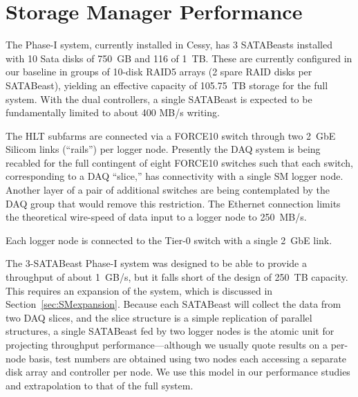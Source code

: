 


\section{Storage Manager Performance}

The Phase-I system, currently installed in Cessy, has
3 SATABeasts installed  with 10 Sata disks of 750~GB  and 116 of 1~TB.
These are currently configured in our baseline in groups of 10-disk RAID5 arrays 
(2 spare RAID disks per SATABeast), yielding an effective capacity of 105.75~TB storage
for the full system.
With the dual controllers, a single SATABeast is expected to be fundamentally 
limited to about 400 MB/s writing.

The HLT subfarms are connected via a FORCE10 switch through
two 2~GbE Silicom links (``rails'') per logger node.
Presently the DAQ system is being recabled for the full contingent of eight FORCE10 switches
such that each switch, corresponding to a DAQ ``slice,'' has connectivity with 
a single SM logger node.
Another layer of a pair of additional switches are being contemplated by the DAQ group
that would remove this restriction.
The Ethernet connection limits the theoretical wire-speed of data input
to a logger node to 250~MB/s.

Each logger node is connected to the Tier-0 switch with a single 2~GbE link.  

The 3-SATABeast Phase-I system was designed to be able to provide a throughput of about 1~GB/s,
but it falls short of the design of 250~TB capacity. 
This requires an expansion of the system, which is discussed in Section~\ref{sec:SMexpansion}.
Because each SATABeast will collect the data from two DAQ slices, and the slice structure
is a simple replication of parallel structures, a single SATABeast fed by two logger nodes
is the atomic unit for projecting throughput performance---although we usually quote
results on a per-node basis, test numbers are
obtained using two nodes each accessing a separate disk array and controller per node.
We use this model in our performance studies and extrapolation to that of the full system.

